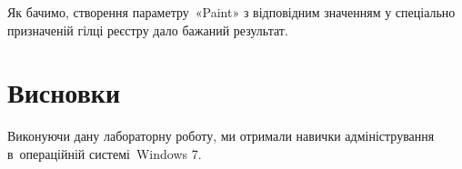 \documentclass[
	a4paper,
	oneside,
	DIV = 12,
	fontsize = 13pt,
	headings = normal,
]{scrartcl}
\begin{document}
		Як бачимо, створення параметру~«\textenglish{Paint}» з відповідним значенням у спеціально призначеній гілці реєстру дало бажаний результат.

	\section{Висновки}
		Виконуючи дану лабораторну роботу, ми отримали навички адміністрування в~операційній системі~\textenglish{Windows 7}.
\end{document}
